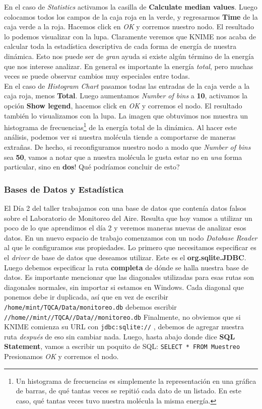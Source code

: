 \documentclass[10pt,letterpaper]{article}
\newcommand{\inlinecode}[1]{
\colorbox{light-gray}{\texttt{#1}}
}
\begin{document}
En el caso de \textit{Statistics} activamos la casilla de \textbf{Calculate median values}. Luego colocamos todos los campos de la caja roja en la verde, y regresarmos \textbf{Time} de la caja verde a la roja. Hacemos click en \textit{OK} y corremos nuestro nodo. El resultado lo podemos visualizar con la lupa. Claramente veremos que KNIME nos acaba de calcular toda la estad\'istica descriptiva de cada forma de energ\'ia de nuestra din\'amica. Esto nos puede ser de \emph{gran} ayuda si existe alg\'un t\'ermino de la energ\'ia que nos interese analizar. En general es importante la energ\'ia \emph{total}, pero muchas veces se puede observar cambios muy especiales entre todas.\\

En el caso de \textit{Histogram Chart} pasamos todas las entradas de la caja verde a la caja roja, menos \textbf{Total}. Luego aumentamos \textit{Number of bins} a \textbf{10}, activamos la opci\'on \textbf{Show legend}, hacemos click en \textit{OK} y corremos el nodo. El resultado tambi\'en lo visualizamos con la lupa. La imagen que obtuvimos nos muestra un histograma de frecuencias\footnote{Un histograma de frecuencias es simplemente la representaci\'on en una gr\'afica de barras, de qu\'e tantas veces se repiti\'o cada dato de un listado. En este caso, qu\'e tantas veces tuvo nuestra mol\'ecula la misma energ\'ia.} de la energ\'ia total de la din\'amica. Al hacer este an\'alisis, podemos ver si nuestra mol\'ecula tiende a comportarse de maneras extra\~nas. De hecho, si reconfiguramos nuestro nodo a modo que \textit{Number of bins} sea \textbf{50}, vamos a notar que a nuestra mol\'ecula le gusta estar no en \emph{una} forma particular, sino en \textbf{dos}! Qu\'e podr\'iamos concluir de esto?

\subsubsection{Bases de Datos y Estad\'istica}

El D\'ia 2 del taller trabajamos con una base de datos que conten\'ia datos falsos sobre el Laboratorio de Monitoreo del Aire. Resulta que hoy vamos a utilizar un poco de lo que aprendimos el d\'ia 2 y veremos maneras nuevas de analizar esos datos. En un nuevo espacio de trabajo comenzamos con un nodo \emph{Database Reader} al que le configuramos sus propiedades. Lo primero que necesitamos especificar es el \emph{driver} de base de datos que deseamos utilizar. Este es el \textbf{org.sqlite.JDBC}. Luego debemos especificar la ruta \textbf{completa} de d\'onde se halla nuestra base de datos. Es importante mencionar que las diagonales utilizadas para esas rutas son diagonales normales, sin importar si estamos en Windows. Cada diagonal que ponemos debe ir duplicada, as\'i que en vez de escribir \inlinecode{/home/mint/TQCA/Data/monitoreo.db} debemos escribir \inlinecode{//home//mint//TQCA//Data//monitoreo.db} Finalmente, no obviemos que si KNIME comienza su URL con \inlinecode{jdbc:sqlite://}, debemos de agregar nuestra ruta \emph{despu\'es} de eso sin cambiar nada. Luego, hasta abajo donde dice \textbf{SQL Statement}, vamos a escribir un poquito de SQL: \inlinecode{SELECT * FROM Muestreo} Presionamos \emph{OK} y corremos el nodo.\\
\end{document}
